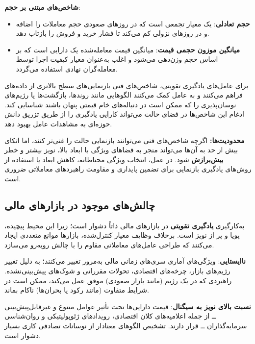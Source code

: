 \documentclass[12pt, a4paper]{report}
\begin{document}
\bigskip
\textbf{شاخص‌های مبتنی بر حجم}:
\begin{itemize}
    \item \textbf{حجم تعادلی}: یک معیار تجمعی است که در روزهای صعودی حجم معاملات را اضافه و در روزهای نزولی کم می‌کند تا فشار خرید و فروش را بازتاب دهد.  
    \item \textbf{میانگین موزون حجمی قیمت}: میانگین قیمت معامله‌شده یک دارایی است که بر اساس حجم وزن‌دهی می‌شود و اغلب به‌عنوان معیار کیفیت اجرا توسط معامله‌گران نهادی استفاده می‌گردد.  
\end{itemize}

\bigskip

برای عامل‌های یادگیری تقویتی، شاخص‌های فنی بازنمایی‌های سطح بالاتری از داده‌های  فراهم می‌کنند و به عامل کمک می‌کنند الگوهایی مانند روندها، بازگشت‌ها یا رژیم‌های نوسان‌پذیری را که ممکن است در دنباله‌های خام قیمتی پنهان باشند شناسایی کند. ادغام این شاخص‌ها در فضای حالت می‌تواند کارایی یادگیری را از طریق تزریق دانش حوزه‌ای به مشاهدات عامل بهبود دهد.  

\bigskip
\textbf{محدودیت‌ها:}  
اگرچه شاخص‌های فنی می‌توانند بازنمایی حالت را غنی‌تر کنند، اما اتکای بیش از حد به آن‌ها می‌تواند منجر به فضاهای ویژگی با ابعاد بالا، نویز بیشتر و خطر \textbf{بیش‌برازش} شود. در عمل، انتخاب ویژگی محتاطانه، کاهش ابعاد یا استفاده از روش‌های یادگیری بازنمایی برای تضمین پایداری و مقاومت راهبردهای معاملاتی ضروری است.  


\subsection{چالش‌های موجود در بازارهای مالی}

به‌کارگیری \textbf{یادگیری تقویتی} در بازارهای مالی ذاتاً دشوار است؛ زیرا این محیط پیچیده، پویا و پر از نویز است. برخلاف وظایف معیار کنترل‌شده، بازارها موانع متعددی ایجاد می‌کنند که طراحی عامل‌های معاملاتی مقاوم را با چالش روبه‌رو می‌سازد.  

\bigskip
\textbf{ناایستایی}:  
ویژگی‌های آماری سری‌های زمانی مالی به‌مرور تغییر می‌کنند؛ به دلیل تغییر رژیم‌های بازار، چرخه‌های اقتصادی، تحولات مقرراتی و شوک‌های پیش‌بینی‌نشده. راهبردی که در یک رژیم (مانند بازار صعودی) موفق عمل می‌کند، ممکن است در شرایط متفاوت (مانند رکود یا بحران‌ها) ناکام بماند.  

\bigskip
\textbf{نسبت بالای نویز به سیگنال}:  
قیمت دارایی‌ها تحت تأثیر عوامل متنوع و غیرقابل‌پیش‌بینی ــ از جمله اعلامیه‌های کلان اقتصادی، رویدادهای ژئوپولیتیکی و روان‌شناسی سرمایه‌گذاران ــ قرار دارند. تشخیص الگوهای معنادار از نوسانات تصادفی کاری بسیار دشوار است.  
\end{document}
